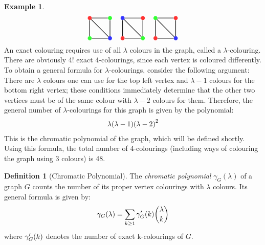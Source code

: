 \documentclass[svgnames]{article}
\theoremstyle{definition}
\newtheorem{Definition}{Definition}
\newtheorem*{Example*}{Example}
\theoremstyle{remark}
\theoremstyle{underline}
\theoremstyle{underline}
\begin{document}
\begin{Example*}
\begin{gather*}
			\tikz[baseline=(current bounding box.center),scale=1,auto=left,every node/.style={circle,inner sep=0pt,minimum size=2mm}]
			{
				\node[fill=red!80] (n1) at (0,1)	{};
				\node[fill=green!80] (n2) at (0,0)	{};
				\node[fill=green!80] (n3) at (1,1)	{};
				\node[fill=blue!80] (n4) at (1,0)	{};
				\foreach \from/\to in {n1/n2, n1/n3, n1/n4, n2/n4, n3/n4}
				\draw[thick] (\from) -- (\to);
			} \hspace{12pt} 
			\tikz[baseline=(current bounding box.center),scale=1,auto=left,every node/.style={circle,inner sep=0pt,minimum size=2mm}]
			{
				\node[fill=blue!80] (n1) at (0,1)	{};
				\node[fill=red!80] (n2) at (0,0)	{};
				\node[fill=red!80] (n3) at (1,1)	{};
				\node[fill=green!80] (n4) at (1,0)	{};
				\foreach \from/\to in {n1/n2, n1/n3, n1/n4, n2/n4, n3/n4}
				\draw[thick] (\from) -- (\to);
			} \hspace{12pt}
			\tikz[baseline=(current bounding box.center),scale=1,auto=left,every node/.style={circle,inner sep=0pt,minimum size=2mm}]
			{
				\node[fill=green!80] (n1) at (0,1)	{};
				\node[fill=red!80] (n2) at (0,0)	{};
				\node[fill=red!80] (n3) at (1,1)	{};
				\node[fill=blue!80] (n4) at (1,0)	{};
				\foreach \from/\to in {n1/n2, n1/n3, n1/n4, n2/n4, n3/n4}
				\draw[thick] (\from) -- (\to);
			}
		\end{gather*}
		An exact colouring requires use of all $\lambda$ colours in the graph, called a $\lambda$-colouring. There are obviously 4! exact 4-colourings, since each vertex is coloured differently. To obtain a general formula for $\lambda$-colourings, consider the following argument: There are $\lambda$ colours one can use for the top left vertex and $\lambda - 1$ colours for the bottom right vertex; these conditions immediately determine that the other two vertices must be of the same colour with $\lambda - 2$ colours for them. Therefore, the general number of $\lambda$-colourings for this graph is given by the polynomial:
		\begin{gather*}
			\lambda\pqty{\lambda -1}\pqty{\lambda-2}^2
		\end{gather*}
		This is the chromatic polynomial of the graph, which will be defined shortly. Using this formula, the total number of 4-colourings (including ways of colouring the graph using 3 colours) is 48.
	\end{Example*}
	\begin{Definition}[Chromatic Polynomial]
		The \emph{chromatic polynomial} $\gamma_G(\lambda)$ of a graph $G$ counts the number of its proper vertex colourings with $\lambda$ colours. Its general formula is given by:
		\begin{gather*}
			\gamma_G\pqty{\lambda} = \sum_{k \geq 1} \gamma'_{G}\pqty{k}\binom{\lambda}{k}
		\end{gather*}
		where $\gamma'_{G}\pqty{k}$ denotes the number of exact k-colourings of $G$.
	\end{Definition}
\end{document}
